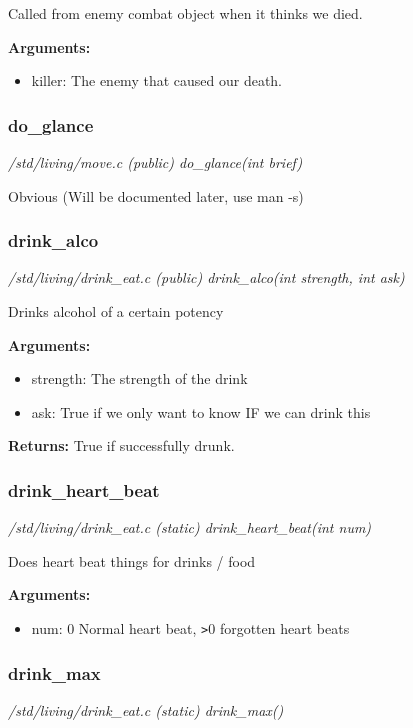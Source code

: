 Called from enemy combat object when it thinks we died.

{\bf Arguments:}
\begin{itemize}
\item      killer: The enemy that caused our death.
\end{itemize}


\subsubsection{do\_glance}

{\em /std/living/move.c (public) do\_glance(int brief)}

Obvious (Will be documented later, use man -s)


\subsubsection{drink\_alco}

{\em /std/living/drink\_eat.c (public) drink\_alco(int strength, int ask)}

Drinks alcohol of a certain potency

{\bf Arguments:}
\begin{itemize}
\item       strength: The strength of the drink
\item ask: True if we only want to know IF we can drink this
\end{itemize}

{\bf Returns:}      True if successfully drunk.


\subsubsection{drink\_heart\_beat}

{\em /std/living/drink\_eat.c (static) drink\_heart\_beat(int num)}

Does heart beat things for drinks / food

{\bf Arguments:}
\begin{itemize}
\item       num: 0 Normal heart beat, \verb+>+0 forgotten heart beats
\end{itemize}


\subsubsection{drink\_max}

{\em /std/living/drink\_eat.c (static) drink\_max()}

